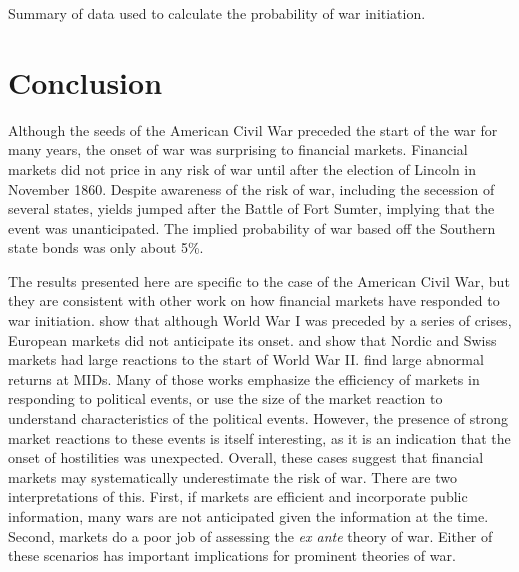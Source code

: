 \begin{table}
  \centering
  
  \caption{Summary of data used to calculate the probability of war initiation.}
\label{acw_onset:tab:prwar1}
\end{table}

\section{Conclusion}
\label{acw_onset:sec:conclusion}

Although the seeds of the American Civil War preceded the start of the war for many years, the onset of war was surprising to financial markets.
Financial markets did not price in any risk of war until after the election of Lincoln in November 1860. 
Despite awareness of the risk of war, including the secession of several states, yields jumped after the Battle of Fort Sumter, implying that the event was unanticipated.
The implied probability of war based off the Southern state bonds was only about 5\%.

The results presented here are specific to the case of the American Civil War, but they are consistent with other work on how financial markets have responded to war initiation.
\textcite{Ferguson2006} show that although World War I was preceded by a series of crises, European markets did not anticipate its onset.
\textcite{FreyKucher2000} and \textcite{WaldenstromFrey2008} show that Nordic and Swiss markets had large reactions to the start of World War II.
\textcite{GuidolinLaFerrara2010} find large abnormal returns at MIDs.
Many of those works emphasize the efficiency of markets in responding to political events, or use the size of the market reaction to understand characteristics of the political events.
However, the presence of strong market reactions to these events is itself interesting, as it is an indication that the onset of hostilities was unexpected.
Overall, these cases suggest that financial markets may systematically underestimate the risk of war.
There are two interpretations of this.
First, if markets are efficient and incorporate public information, many wars are not anticipated given the information at the time.
Second, markets do a poor job of assessing the \textit{ex ante} theory of war.
Either of these scenarios has important implications for prominent theories of war.

